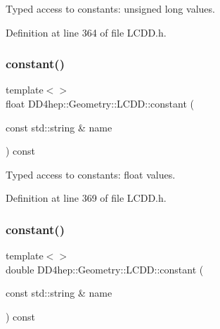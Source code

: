 Typed access to constants\+: unsigned long values. 



Definition at line 364 of file L\+C\+D\+D.\+h.

\hypertarget{class_d_d4hep_1_1_geometry_1_1_l_c_d_d_abb713d2747bb86781643a7a61e2aac1b}{}\label{class_d_d4hep_1_1_geometry_1_1_l_c_d_d_abb713d2747bb86781643a7a61e2aac1b} 
\subsubsection{\texorpdfstring{constant()}{constant()}\hspace{0.1cm}{\footnotesize\ttfamily [9/10]}}
{\footnotesize\ttfamily template$<$$>$ \\
float D\+D4hep\+::\+Geometry\+::\+L\+C\+D\+D\+::constant (\begin{DoxyParamCaption}\item[{const std\+::string \&}]{name }\end{DoxyParamCaption}) const\hspace{0.3cm}{\ttfamily [inline]}}



Typed access to constants\+: float values. 



Definition at line 369 of file L\+C\+D\+D.\+h.

\hypertarget{class_d_d4hep_1_1_geometry_1_1_l_c_d_d_a0cba20e59cf2775f22264447e29b0d3c}{}\label{class_d_d4hep_1_1_geometry_1_1_l_c_d_d_a0cba20e59cf2775f22264447e29b0d3c} 
\subsubsection{\texorpdfstring{constant()}{constant()}\hspace{0.1cm}{\footnotesize\ttfamily [10/10]}}
{\footnotesize\ttfamily template$<$$>$ \\
double D\+D4hep\+::\+Geometry\+::\+L\+C\+D\+D\+::constant (\begin{DoxyParamCaption}\item[{const std\+::string \&}]{name }\end{DoxyParamCaption}) const\hspace{0.3cm}{\ttfamily [inline]}}



